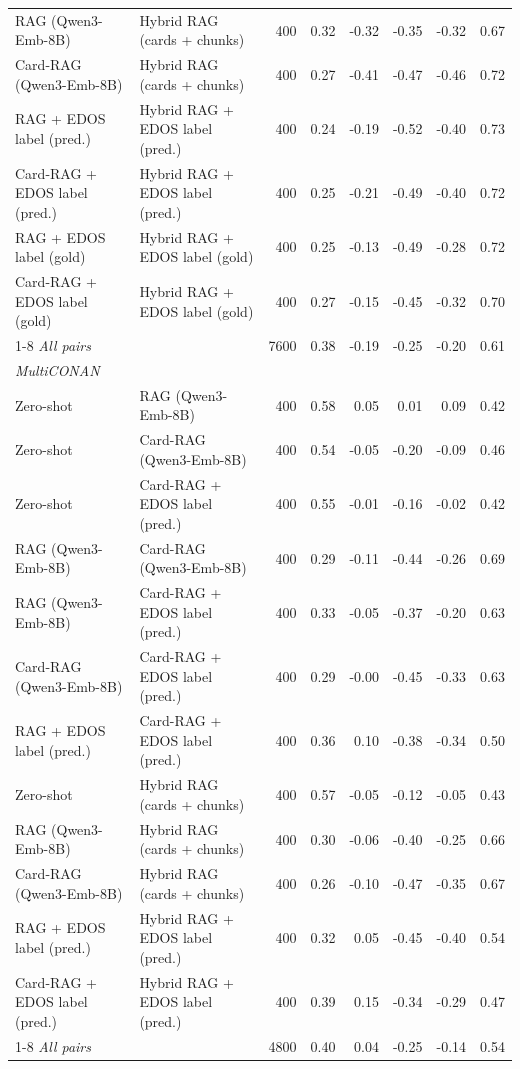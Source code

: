 \begin{table}[t]
{\begin{tabular}{llrrrrrr}
RAG (Qwen3-Emb-8B) & Hybrid RAG (cards + chunks) & 400 & 0.32 & -0.32 & -0.35 & -0.32 & 0.67 \\
Card-RAG (Qwen3-Emb-8B) & Hybrid RAG (cards + chunks) & 400 & 0.27 & -0.41 & -0.47 & -0.46 & 0.72 \\
RAG + EDOS label (pred.) & Hybrid RAG + EDOS label (pred.) & 400 & 0.24 & -0.19 & -0.52 & -0.40 & 0.73 \\
Card-RAG + EDOS label (pred.) & Hybrid RAG + EDOS label (pred.) & 400 & 0.25 & -0.21 & -0.49 & -0.40 & 0.72 \\
RAG + EDOS label (gold) & Hybrid RAG + EDOS label (gold) & 400 & 0.25 & -0.13 & -0.49 & -0.28 & 0.72 \\
Card-RAG + EDOS label (gold) & Hybrid RAG + EDOS label (gold) & 400 & 0.27 & -0.15 & -0.45 & -0.32 & 0.70 \\
\cmidrule(lr){1-8}
\textit{All pairs} &  & 7600 & 0.38 & -0.19 & -0.25 & -0.20 & 0.61 \\
\midrule
\multicolumn{8}{l}{\textit{MultiCONAN}} \\
Zero-shot & RAG (Qwen3-Emb-8B) & 400 & 0.58 & 0.05 & 0.01 & 0.09 & 0.42 \\
Zero-shot & Card-RAG (Qwen3-Emb-8B) & 400 & 0.54 & -0.05 & -0.20 & -0.09 & 0.46 \\
Zero-shot & Card-RAG + EDOS label (pred.) & 400 & 0.55 & -0.01 & -0.16 & -0.02 & 0.42 \\
RAG (Qwen3-Emb-8B) & Card-RAG (Qwen3-Emb-8B) & 400 & 0.29 & -0.11 & -0.44 & -0.26 & 0.69 \\
RAG (Qwen3-Emb-8B) & Card-RAG + EDOS label (pred.) & 400 & 0.33 & -0.05 & -0.37 & -0.20 & 0.63 \\
Card-RAG (Qwen3-Emb-8B) & Card-RAG + EDOS label (pred.) & 400 & 0.29 & -0.00 & -0.45 & -0.33 & 0.63 \\
RAG + EDOS label (pred.) & Card-RAG + EDOS label (pred.) & 400 & 0.36 & 0.10 & -0.38 & -0.34 & 0.50 \\
Zero-shot & Hybrid RAG (cards + chunks) & 400 & 0.57 & -0.05 & -0.12 & -0.05 & 0.43 \\
RAG (Qwen3-Emb-8B) & Hybrid RAG (cards + chunks) & 400 & 0.30 & -0.06 & -0.40 & -0.25 & 0.66 \\
Card-RAG (Qwen3-Emb-8B) & Hybrid RAG (cards + chunks) & 400 & 0.26 & -0.10 & -0.47 & -0.35 & 0.67 \\
RAG + EDOS label (pred.) & Hybrid RAG + EDOS label (pred.) & 400 & 0.32 & 0.05 & -0.45 & -0.40 & 0.54 \\
Card-RAG + EDOS label (pred.) & Hybrid RAG + EDOS label (pred.) & 400 & 0.39 & 0.15 & -0.34 & -0.29 & 0.47 \\
\cmidrule(lr){1-8}
\textit{All pairs} &  & 4800 & 0.40 & 0.04 & -0.25 & -0.14 & 0.54 \\
\bottomrule
\end{tabular}%
}
\end{table}
